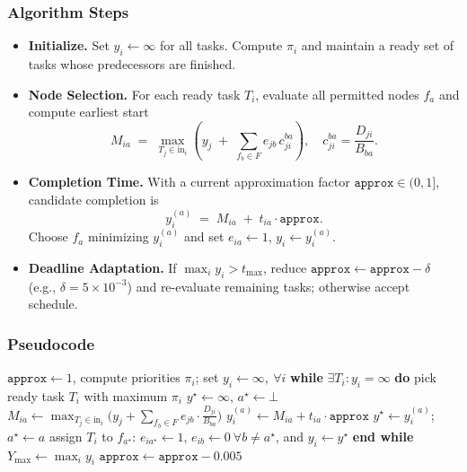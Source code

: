 \subsubsection{Algorithm Steps}
\begin{itemize}
    \item \textbf{Initialize.} Set \(y_i\gets\infty\) for all tasks. Compute \(\pi_i\) and maintain a ready set of tasks whose predecessors are finished.
    \item \textbf{Node Selection.} For each ready task \(T_i\), evaluate all permitted nodes \(f_a\) and compute earliest start
    \[
    M_{ia} \;=\; \max_{T_j\in \text{in}_i}\!\left( y_j \;+\; \sum_{f_b\in F} e_{jb}\,c_{ji}^{ba}\right),
    \quad c_{ji}^{ba}=\frac{D_{ji}}{B_{ba}}.
    \]
    \item \textbf{Completion Time.} With a current approximation factor \(\texttt{approx}\in(0,1]\), candidate completion is
    \[
    y_i^{(a)} \;=\; M_{ia} \;+\; t_{ia}\cdot \texttt{approx}.
    \]
    Choose \(f_a\) minimizing \(y_i^{(a)}\) and set \(e_{ia}\gets 1\), \(y_i\gets y_i^{(a)}\).
    \item \textbf{Deadline Adaptation.} If \(\max_i y_i > t_{\max}\), reduce \(\texttt{approx}\leftarrow \texttt{approx}-\delta\) (e.g., \(\delta=5\!\times\!10^{-3}\)) and re-evaluate remaining tasks; otherwise accept schedule.
\end{itemize}

\subsubsection{Pseudocode}
\begin{algorithm}[t]
\caption{Bandwidth/Data-Aware Greedy DAG Scheduler}
\label{alg:greedy_scheduler}
\begin{algorithmic}[1]
\STATE $\texttt{approx}\leftarrow 1$, compute priorities $\pi_i$; set $y_i\leftarrow\infty,\ \forall i$
\REPEAT
  \STATE \textbf{while} $\exists T_i: y_i=\infty$ \textbf{do}
    \STATE pick ready task $T_i$ with maximum $\pi_i$
    \STATE $y^\star\leftarrow\infty$, $a^\star\leftarrow\bot$
        \STATE $M_{ia}\leftarrow \max_{T_j\in \text{in}_i}\big(y_j+\sum_{f_b\in F} e_{jb}\cdot \tfrac{D_{ji}}{B_{ba}}\big)$
        \STATE $y_i^{(a)}\leftarrow M_{ia}+t_{ia}\cdot \texttt{approx}$
            \STATE $y^\star\leftarrow y_i^{(a)}$; $a^\star\leftarrow a$ 
        \ENDIF
    \ENDFOR
    \STATE assign $T_i$ to $f_{a^\star}$: $e_{ia^\star}\leftarrow 1$, $e_{ib}\leftarrow 0\ \forall b\neq a^\star$, and $y_i\leftarrow y^\star$
  \STATE \textbf{end while}
  \STATE $Y_{\max}\leftarrow \max_i y_i$
   \STATE $\texttt{approx}\leftarrow \texttt{approx}-0.005$ \ENDIF
{}
\end{algorithmic}
\end{algorithm}

